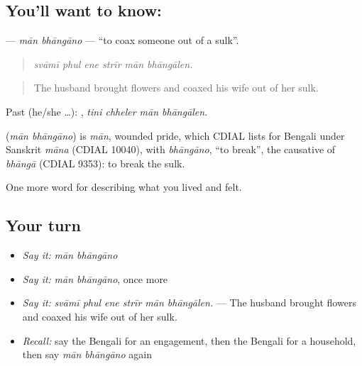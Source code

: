 \subsection*{You'll want to know:  }
\textbf{ } — \emph{mān bhāngāno} — \textquotedblleft{}to coax someone out of a sulk\textquotedblright{}.

\begin{quote}
     
\end{quote}

\begin{quote}
\emph{svāmī phul ene strīr mān bhāngālen.}
\end{quote}

\begin{quote}
The husband brought flowers and coaxed his wife out of her sulk.
\end{quote}

Past (he/she …):    , \emph{tini chheler mān bhāngālen}.

\begin{cousinweb}
\textbf{ } (\emph{mān bhāngāno}) is \emph{mān}, wounded pride, which CDIAL lists for Bengali under Sanskrit \emph{māna} (CDIAL 10040), with \emph{bhāngāno}, \textquotedblleft{}to break\textquotedblright{}, the causative of \emph{bhāngā} (CDIAL 9353): to break the sulk.
\end{cousinweb}

\begin{grammarlens}[title={What you've built}]
One more word for describing what you lived and felt.
\end{grammarlens}

\subsection*{Your turn}
\begin{itemize}
\raggedright
  \item \emph{Say it:} \emph{mān bhāngāno}
  \item \emph{Say it:} \emph{mān bhāngāno}, once more
  \item \emph{Say it:} \emph{svāmī phul ene strīr mān bhāngālen.} — The husband brought flowers and coaxed his wife out of her sulk.
  \item \emph{Recall:} say the Bengali for an engagement, then the Bengali for a household, then say \emph{mān bhāngāno} again
\end{itemize}

